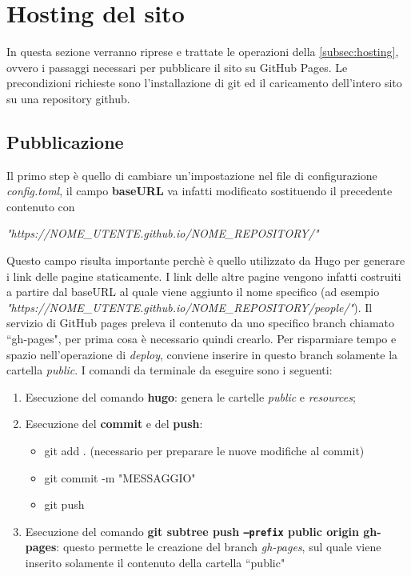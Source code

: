 \documentclass[target=bach,aauheader=]{thud}
\begin{document}
\section{Hosting del sito}
In questa sezione verranno riprese e trattate le operazioni della \cref{subsec:hosting}, ovvero i passaggi necessari per pubblicare il sito su GitHub Pages. 
Le precondizioni richieste sono l'installazione di git ed il caricamento dell'intero sito su una repository github. 

\subsection{Pubblicazione}
Il primo step è quello di cambiare un'impostazione nel file di configurazione \textit{config.toml}, il campo \textbf{baseURL} va infatti modificato sostituendo il precedente contenuto con
\begin{center}
    \textit{"https://NOME\_UTENTE.github.io/NOME\_REPOSITORY/"}
\end{center}
Questo campo risulta importante perchè è quello utilizzato da Hugo per generare i link delle pagine staticamente. I link delle altre pagine vengono infatti costruiti a partire dal baseURL al quale viene aggiunto il nome specifico (ad esempio \textit{"https://NOME\_UTENTE.github.io/NOME\_REPOSITORY/people/"}).
\newline
Il servizio di GitHub pages preleva il contenuto da uno specifico branch chiamato ``gh-pages", per prima cosa è necessario quindi crearlo. Per risparmiare tempo e spazio nell'operazione di \textit{deploy}, conviene inserire in questo branch solamente la cartella \textit{public}. 
I comandi da terminale da eseguire sono i seguenti:
\begin{enumerate}
    \item Esecuzione del comando \textbf{hugo}: genera le cartelle \textit{public} e \textit{resources};
    \item Esecuzione del \textbf{commit} e del \textbf{push}:
    \begin{itemize}
        \item git add . (necessario per preparare le nuove modifiche al commit)
        \item git commit -m "MESSAGGIO"
        \item git push
    \end{itemize}
    \item Esecuzione del comando \textbf{git subtree push \texttt{--prefix} public origin gh-pages}: questo permette le creazione del branch \textit{gh-pages}, sul quale viene inserito solamente il contenuto della cartella ``public" 
\end{enumerate}
\end{document}
